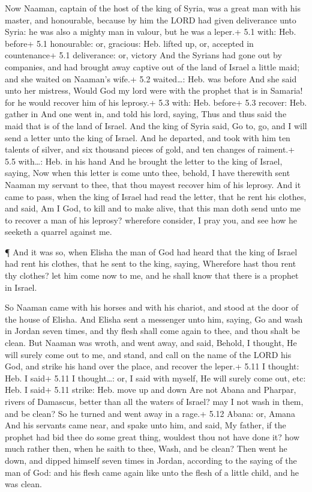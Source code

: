  Now Naaman, captain of the host of the king of Syria, was a
great man with his master, and honourable, because by him the LORD had
given deliverance unto Syria: he was also a mighty man in valour, but he
was a leper.+ 5.1 with: Heb. before+ 5.1 honourable: or, gracious: Heb.
lifted up, or, accepted in countenance+ 5.1 deliverance: or, victory
 And the Syrians had gone out by companies, and had brought
away captive out of the land of Israel a little maid; and she waited on
Naaman's wife.+ 5.2 waited\ldots: Heb. was before  And she
said unto her mistress, Would God my lord were with the prophet that is
in Samaria! for he would recover him of his leprosy.+ 5.3 with: Heb.
before+ 5.3 recover: Heb. gather in  And one went in, and
told his lord, saying, Thus and thus said the maid that is of the land
of Israel.  And the king of Syria said, Go to, go, and I
will send a letter unto the king of Israel. And he departed, and took
with him ten talents of silver, and six thousand pieces of gold, and ten
changes of raiment.+ 5.5 with\ldots: Heb. in his hand  And
he brought the letter to the king of Israel, saying, Now when this
letter is come unto thee, behold, I have therewith sent Naaman my
servant to thee, that thou mayest recover him of his leprosy.
 And it came to pass, when the king of Israel had read the
letter, that he rent his clothes, and said, Am I God, to kill and to
make alive, that this man doth send unto me to recover a man of his
leprosy? wherefore consider, I pray you, and see how he seeketh a
quarrel against me.

 ¶ And it was so, when Elisha the man of God had heard that
the king of Israel had rent his clothes, that he sent to the king,
saying, Wherefore hast thou rent thy clothes? let him come now to me,
and he shall know that there is a prophet in Israel.

 So Naaman came with his horses and with his chariot, and
stood at the door of the house of Elisha.  And Elisha sent
a messenger unto him, saying, Go and wash in Jordan seven times, and thy
flesh shall come again to thee, and thou shalt be clean. 
But Naaman was wroth, and went away, and said, Behold, I thought, He
will surely come out to me, and stand, and call on the name of the LORD
his God, and strike his hand over the place, and recover the leper.+
5.11 I thought: Heb. I said+ 5.11 I thought\ldots: or, I said with
myself, He will surely come out, etc: Heb. I said+ 5.11 strike: Heb.
move up and down  Are not Abana and Pharpar, rivers of
Damascus, better than all the waters of Israel? may I not wash in them,
and be clean? So he turned and went away in a rage.+ 5.12 Abana: or,
Amana  And his servants came near, and spake unto him, and
said, My father, if the prophet had bid thee do some great thing,
wouldest thou not have done it? how much rather then, when he saith to
thee, Wash, and be clean?  Then went he down, and dipped
himself seven times in Jordan, according to the saying of the man of
God: and his flesh came again like unto the flesh of a little child, and
he was clean.

